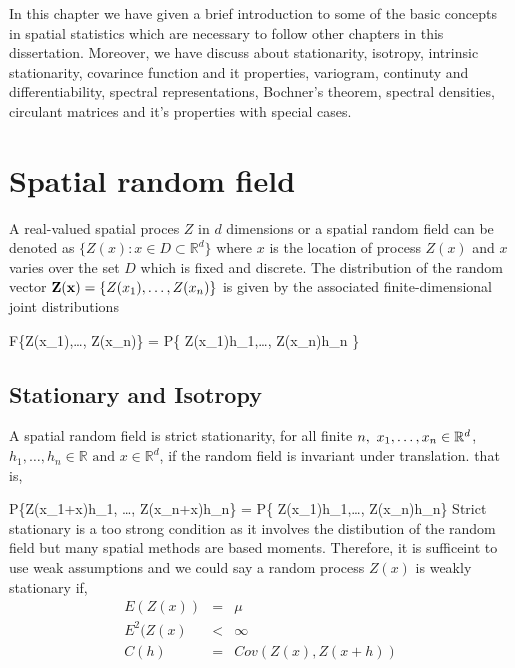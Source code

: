 
In this chapter we have given a brief introduction to some of the basic concepts in spatial statistics which are necessary to follow other chapters in this dissertation. Moreover, we have discuss about stationarity, isotropy, intrinsic stationarity, covarince function and it properties, variogram, continuty and differentiability, spectral representations, Bochner's theorem, spectral densities, circulant matrices and it's properties with special cases.   

\section{Spatial random field} 

A real-valued spatial proces $Z$ in $d$ dimensions or a spatial random field can be denoted as $\{Z(x): x \in D \subset \mathbb{R}^d\}$ where $x$ is the location of process $Z(x)$ and $x$ varies over the set $D$ which is fixed and discrete. The distribution of the random vector ${\bf Z(x)}=\{Z(x_1),\ldots, Z(x_n)\}$ is given by the associated finite-dimensional joint distributions

\beq
F\{Z(x_1),\ldots, Z(x_n)\} = P\{ Z(x_1)\le h_1,\ldots, Z(x_n)\le h_n \}
\eeq

\subsection{Stationary and Isotropy}
A spatial random field is strict stationarity, for all finite $n,\ x_1,\ldots, x_n \in \mathbb{R}^d$, $h_1, \ldots, h_n\in\mathbb{R} \mbox{ and } x\in \mathbb{R}^d$, if the random field is invariant under translation. that is,

\beq
P\{Z(x_1+x)\le h_1, \ldots, Z(x_n+x)\le h_n\} = P\{ Z(x_1)\le h_1,\ldots, Z(x_n)\le h_n\}
\eeq
Strict stationary is a too strong condition as it involves the distibution of the random field but many spatial methods are based moments. Therefore, it is sufficeint to use weak assumptions and we could say a random process $Z(x)$ is weakly stationary if, 
\begin{eqnarray}
	E(Z(x))   & = & \mu \nonumber \\ 
	E^2(Z(x)  & < & \infty \nonumber \\  
	C(h)      & = & Cov(Z(x),Z(x+h))
\end{eqnarray}

